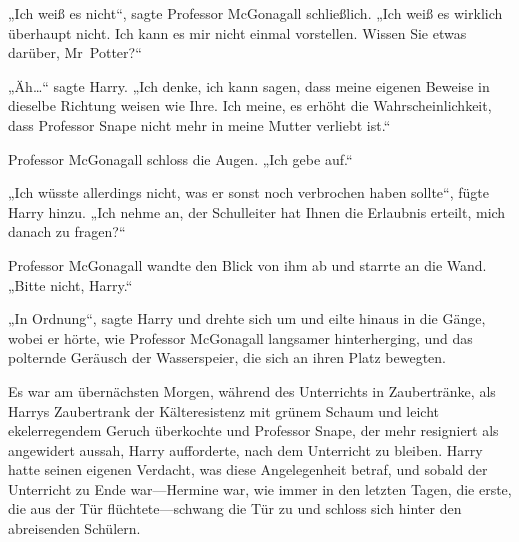 \later

„Ich weiß es nicht“, sagte Professor McGonagall schließlich. „Ich weiß es wirklich überhaupt nicht. Ich kann es mir nicht einmal vorstellen. Wissen Sie etwas darüber, Mr~Potter?“

„Äh…“ sagte Harry. „Ich denke, ich kann sagen, dass meine eigenen Beweise in dieselbe Richtung weisen wie Ihre. Ich meine, es erhöht die Wahrscheinlichkeit, dass Professor Snape nicht mehr in meine Mutter verliebt ist.“

Professor McGonagall schloss die Augen. „Ich gebe auf.“

„Ich wüsste allerdings nicht, was er sonst noch verbrochen haben sollte“, fügte Harry hinzu. „Ich nehme an, der Schulleiter hat Ihnen die Erlaubnis erteilt, mich danach zu fragen?“

Professor McGonagall wandte den Blick von ihm ab und starrte an die Wand. „Bitte nicht, Harry.“

„In Ordnung“, sagte Harry und drehte sich um und eilte hinaus in die Gänge, wobei er hörte, wie Professor McGonagall langsamer hinterherging, und das polternde Geräusch der Wasserspeier, die sich an ihren Platz bewegten.

\later

Es war am übernächsten Morgen, während des Unterrichts in Zaubertränke, als Harrys Zaubertrank der Kälteresistenz mit grünem Schaum und leicht ekelerregendem Geruch überkochte und Professor Snape, der mehr resigniert als angewidert aussah, Harry aufforderte, nach dem Unterricht zu bleiben. Harry hatte seinen eigenen Verdacht, was diese Angelegenheit betraf, und sobald der Unterricht zu Ende war—Hermine war, wie immer in den letzten Tagen, die erste, die aus der Tür flüchtete—schwang die Tür zu und schloss sich hinter den abreisenden Schülern.

